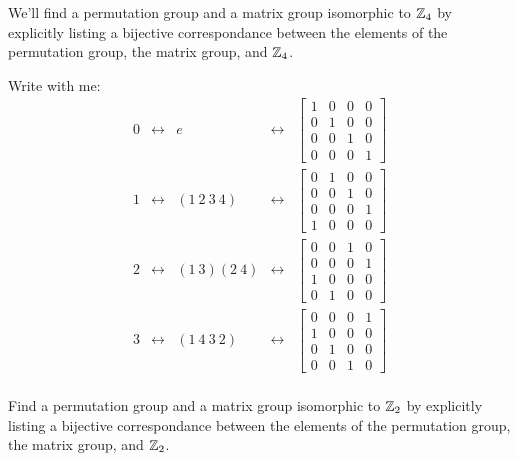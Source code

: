 \documentclass{ximera}
\begin{document}
\begin{example}
  We'll find a permutation group and a matrix group isomorphic to
  $\mathbb Z_4$ by explicitly listing a bijective correspondance between the
  elements of the permutation group, the matrix group, and $\mathbb Z_4$.

  Write with me:
  \[
  \renewcommand{\arraystretch}{2.5}
  \begin{array}{ccccc}
    0 & \leftrightarrow & e & \leftrightarrow & \left[\begin{smallmatrix} 1 & 0 & 0 & 0 \\ 0 & 1 & 0 & 0 \\ 0 & 0 & 1 & 0 \\ 0 & 0 & 0 & 1 \end{smallmatrix}\right]\\
    1 & \leftrightarrow & (1 \ 2 \ 3\ 4) & \leftrightarrow & \left[\begin{smallmatrix} 0 & 1 & 0 & 0 \\ 0 & 0 & 1 & 0 \\ 0 & 0 & 0 & 1 \\ 1 & 0 & 0 & 0 \end{smallmatrix}\right]\\
    2 & \leftrightarrow & (1 \ 3)(2\ 4) & \leftrightarrow & \left[\begin{smallmatrix} 0 & 0 & 1 & 0 \\ 0 & 0 & 0 & 1 \\ 1 & 0 & 0 & 0 \\ 0 & 1 & 0 & 0 \end{smallmatrix}\right]\\
    3 & \leftrightarrow & (1 \ 4 \ 3\ 2) & \leftrightarrow & \left[\begin{smallmatrix} 0 & 0 & 0 & 1 \\ 1 & 0 & 0 & 0 \\ 0 & 1 & 0 & 0 \\ 0 & 0 & 1 & 0 \end{smallmatrix}\right]\\
  \end{array}
  \]
\end{example}




\begin{exercise}
  Find a permutation group and a matrix group isomorphic to $\mathbb Z_2$ by
  explicitly listing a bijective correspondance between the elements
  of the permutation group, the matrix group, and $\mathbb Z_2$.
\end{exercise}
\end{document}
